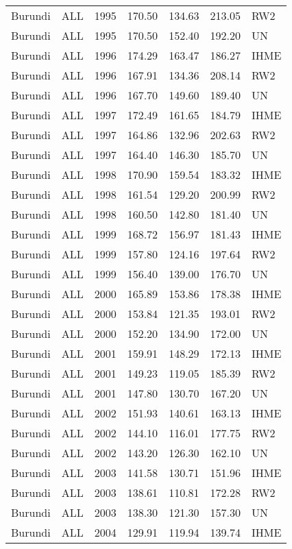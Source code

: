 \begin{longtable}{lllrrrl}
  Burundi & ALL & 1995 & 170.50 & 134.63 & 213.05 & RW2 \\ 
  Burundi & ALL & 1995 & 170.50 & 152.40 & 192.20 & UN \\ 
  Burundi & ALL & 1996 & 174.29 & 163.47 & 186.27 & IHME \\ 
  Burundi & ALL & 1996 & 167.91 & 134.36 & 208.14 & RW2 \\ 
  Burundi & ALL & 1996 & 167.70 & 149.60 & 189.40 & UN \\ 
  Burundi & ALL & 1997 & 172.49 & 161.65 & 184.79 & IHME \\ 
  Burundi & ALL & 1997 & 164.86 & 132.96 & 202.63 & RW2 \\ 
  Burundi & ALL & 1997 & 164.40 & 146.30 & 185.70 & UN \\ 
  Burundi & ALL & 1998 & 170.90 & 159.54 & 183.32 & IHME \\ 
  Burundi & ALL & 1998 & 161.54 & 129.20 & 200.99 & RW2 \\ 
  Burundi & ALL & 1998 & 160.50 & 142.80 & 181.40 & UN \\ 
  Burundi & ALL & 1999 & 168.72 & 156.97 & 181.43 & IHME \\ 
  Burundi & ALL & 1999 & 157.80 & 124.16 & 197.64 & RW2 \\ 
  Burundi & ALL & 1999 & 156.40 & 139.00 & 176.70 & UN \\ 
  Burundi & ALL & 2000 & 165.89 & 153.86 & 178.38 & IHME \\ 
  Burundi & ALL & 2000 & 153.84 & 121.35 & 193.01 & RW2 \\ 
  Burundi & ALL & 2000 & 152.20 & 134.90 & 172.00 & UN \\ 
  Burundi & ALL & 2001 & 159.91 & 148.29 & 172.13 & IHME \\ 
  Burundi & ALL & 2001 & 149.23 & 119.05 & 185.39 & RW2 \\ 
  Burundi & ALL & 2001 & 147.80 & 130.70 & 167.20 & UN \\ 
  Burundi & ALL & 2002 & 151.93 & 140.61 & 163.13 & IHME \\ 
  Burundi & ALL & 2002 & 144.10 & 116.01 & 177.75 & RW2 \\ 
  Burundi & ALL & 2002 & 143.20 & 126.30 & 162.10 & UN \\ 
  Burundi & ALL & 2003 & 141.58 & 130.71 & 151.96 & IHME \\ 
  Burundi & ALL & 2003 & 138.61 & 110.81 & 172.28 & RW2 \\ 
  Burundi & ALL & 2003 & 138.30 & 121.30 & 157.30 & UN \\ 
  Burundi & ALL & 2004 & 129.91 & 119.94 & 139.74 & IHME \\ 

\end{longtable}
